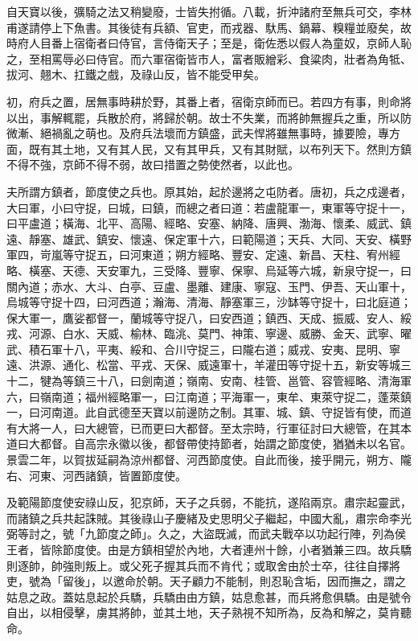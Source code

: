 \begin{pinyinscope}
 自天寶以後，彍騎之法又稍變廢，士皆失拊循。八載，折沖諸府至無兵可交，李林甫遂請停上下魚書。其後徒有兵額、官吏，而戎器、馱馬、鍋幕、糗糧並廢矣，故時府人目番上宿衛者曰侍官，言侍衛天子；至是，衛佐悉以假人為童奴，京師人恥之，至相罵辱必曰侍官。而六軍宿衛皆市人，富者販繒彩、食粱肉，壯者為角牴、拔河、翹木、扛鐵之戲，及祿山反，皆不能受甲矣。



 初，府兵之置，居無事時耕於野，其番上者，宿衛京師而已。若四方有事，則命將以出，事解輒罷，兵散於府，將歸於朝。故士不失業，而將帥無握兵之重，所以防微漸、絕禍亂之萌也。及府兵法壞而方鎮盛，武夫悍將雖無事時，據要險，專方面，既有其土地，又有其人民，又有其甲兵，又有其財賦，以布列天下。然則方鎮不得不強，京師不得不弱，故曰措置之勢使然者，以此也。



 夫所謂方鎮者，節度使之兵也。原其始，起於邊將之屯防者。唐初，兵之戍邊者，大曰軍，小曰守捉，曰城，曰鎮，而總之者曰道：若盧龍軍一，東軍等守捉十一，曰平盧道；橫海、北平、高陽、經略、安塞、納降、唐興、渤海、懷柔、威武、鎮遠、靜塞、雄武、鎮安、懷遠、保定軍十六，曰範陽道；天兵、大同、天安、橫野軍四，岢嵐等守捉五，曰河東道；朔方經略、豐安、定遠、新昌、天柱、宥州經略、橫塞、天德、天安軍九，三受降、豐寧、保寧、烏延等六城，新泉守捉一，曰關內道；赤水、大斗、白亭、豆盧、墨離、建康、寧寇、玉門、伊吾、天山軍十，烏城等守捉十四，曰河西道；瀚海、清海、靜塞軍三，沙缽等守捉十，曰北庭道；保大軍一，鷹娑都督一，蘭城等守捉八，曰安西道；鎮西、天成、振威、安人、綏戎、河源、白水、天威、榆林、臨洮、莫門、神策、寧邊、威勝、金天、武寧、曜武、積石軍十八，平夷、綏和、合川守捉三，曰隴右道；威戎、安夷、昆明、寧遠、洪源、通化、松當、平戎、天保、威遠軍十，羊灌田等守捉十五，新安等城三十二，犍為等鎮三十八，曰劍南道；嶺南、安南、桂管、邕管、容管經略、清海軍六，曰嶺南道；福州經略軍一，曰江南道；平海軍一，東牟、東萊守捉二，蓬萊鎮一，曰河南道。此自武德至天寶以前邊防之制。其軍、城、鎮、守捉皆有使，而道有大將一人，曰大總管，已而更曰大都督。至太宗時，行軍征討曰大總管，在其本道曰大都督。自高宗永徽以後，都督帶使持節者，始謂之節度使，猶猶未以名官。景雲二年，以賀拔延嗣為涼州都督、河西節度使。自此而後，接乎開元，朔方、隴右、河東、河西諸鎮，皆置節度使。



 及範陽節度使安祿山反，犯京師，天子之兵弱，不能抗，遂陷兩京。肅宗起靈武，而諸鎮之兵共起誅賊。其後祿山子慶緒及史思明父子繼起，中國大亂，肅宗命李光弼等討之，號「九節度之師」。久之，大盜既滅，而武夫戰卒以功起行陣，列為侯王者，皆除節度使。由是方鎮相望於內地，大者連州十餘，小者猶兼三四。故兵驕則逐帥，帥強則叛上。或父死子握其兵而不肯代；或取舍由於士卒，往往自擇將吏，號為「留後」，以邀命於朝。天子顧力不能制，則忍恥含垢，因而撫之，謂之姑息之政。蓋姑息起於兵驕，兵驕由由方鎮，姑息愈甚，而兵將愈俱驕。由是號令自出，以相侵擊，虜其將帥，並其土地，天子熟視不知所為，反為和解之，莫肯聽命。




\end{pinyinscope}
